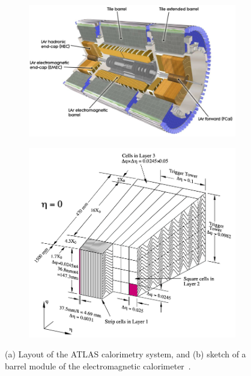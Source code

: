 \begin{figure}[h!]
    \begin{subfigure}[b]{0.59\textwidth}
    \centering
    \includegraphics[width=\textwidth]{figures/calorimeter-system.png}
    \caption{}
    \label{subfig:calorimeter-system}
    \end{subfigure}
    \hfill
    \begin{subfigure}[b]{0.4\textwidth}
    \centering
    \includegraphics[width=\textwidth]{figures/Em-calorimeter.png}
    \caption{}
    \label{subfig:em-calorimeter-module}
    \end{subfigure}
    \caption{(a) Layout of the ATLAS calorimetry system, and (b) sketch of a barrel module of the electromagnetic calorimeter~\cite{atlas_exp_2008}.}
    \label{fig:calorimeter}
\end{figure}

